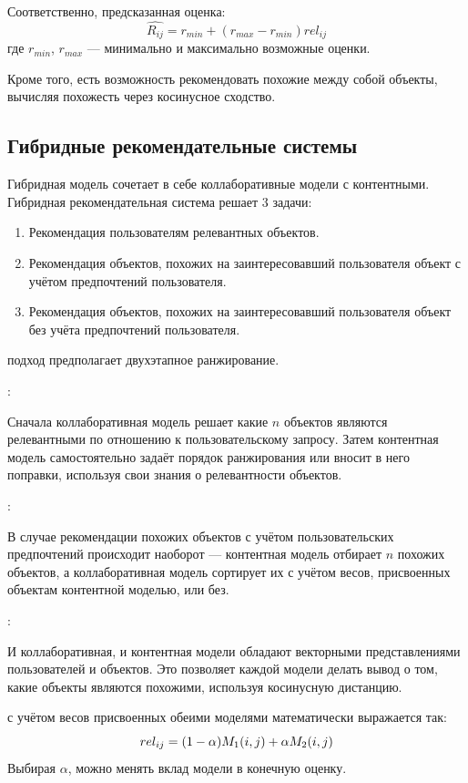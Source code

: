 Соответственно, предсказанная оценка:
\begin{equation}\label{eq:content-user-rating}
        \hat{R_{ij}} = r_{min} + (r_{max} - r_{min}) rel_{ij}
\end{equation}
где $r_{min}$, $r_{max}$ --- минимально и максимально возможные оценки.

Кроме того, есть возможность рекомендовать похожие между собой объекты, вычисляя похожесть через косинусное сходство.
\pagebreak

\subsection{Гибридные рекомендательные системы}\label{subsec:hybrid_rec_systems}
Гибридная модель сочетает в себе коллаборативные модели с контентными.
Гибридная рекомендательная система решает 3 задачи:
\begin{enumerate}
    \item Рекомендация пользователям релевантных объектов.
    \item Рекомендация объектов, похожих на заинтересовавший пользователя объект с учётом предпочтений пользователя.
    \item Рекомендация объектов, похожих на заинтересовавший пользователя объект без учёта предпочтений пользователя.
\end{enumerate}

 подход предполагает двухэтапное ранжирование.

:
\begin{addmargin}[2em]{1em}%
Сначала коллаборативная модель решает какие $n$ объектов являются релевантными по отношению к пользовательскому запросу.
Затем контентная модель самостоятельно задаёт порядок ранжирования или вносит в него поправки, используя свои знания о релевантности объектов.
\end{addmargin}

:
\begin{addmargin}[2em]{1em}%
В случае рекомендации похожих объектов с учётом пользовательских предпочтений происходит наоборот --- контентная модель отбирает $n$ похожих объектов, а коллаборативная модель сортирует их с учётом весов, присвоенных объектам контентной моделью, или без.
\end{addmargin}

:
\begin{addmargin}[2em]{1em}%
И коллаборативная, и контентная модели обладают векторными представлениями пользователей и объектов.
Это позволяет каждой модели делать вывод о том, какие объекты являются похожими, используя косинусную дистанцию.
\end{addmargin}

 с учётом весов присвоенных обеими моделями математически выражается так:
\begin{equation}\label{eq:hybrid}
rel_{ij} = (1 - \alpha)\space M_1(i, j) + \alpha\space M_2(i, j)
\end{equation}
Выбирая $\alpha$, можно менять вклад модели в конечную оценку.